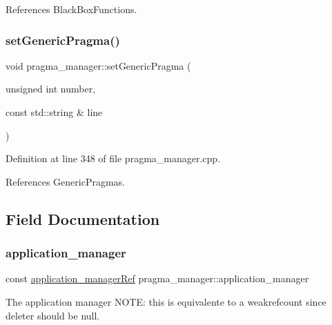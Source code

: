 References Black\+Box\+Functions.

\mbox{\label{classpragma__manager_a5019e9a4c8938b27b6f3cfe2f597542a}} 
\subsubsection{\texorpdfstring{set\+Generic\+Pragma()}{setGenericPragma()}}
{\footnotesize\ttfamily void pragma\+\_\+manager\+::set\+Generic\+Pragma (\begin{DoxyParamCaption}\item[{unsigned int}]{number,  }\item[{const std\+::string \&}]{line }\end{DoxyParamCaption})}



Definition at line 348 of file pragma\+\_\+manager.\+cpp.



References Generic\+Pragmas.



\subsection{Field Documentation}
\mbox{\label{classpragma__manager_ad94113f0d7d54790b0b0be2be6eba8da}} 
\subsubsection{\texorpdfstring{application\+\_\+manager}{application\_manager}}
{\footnotesize\ttfamily const \hyperlink{application__manager_8hpp_a04ccad4e5ee401e8934306672082c180}{application\+\_\+manager\+Ref} pragma\+\_\+manager\+::application\+\_\+manager\hspace{0.3cm}{\ttfamily [protected]}}



The application manager N\+O\+TE\+: this is equivalente to a weakrefcount since deleter should be null. 



